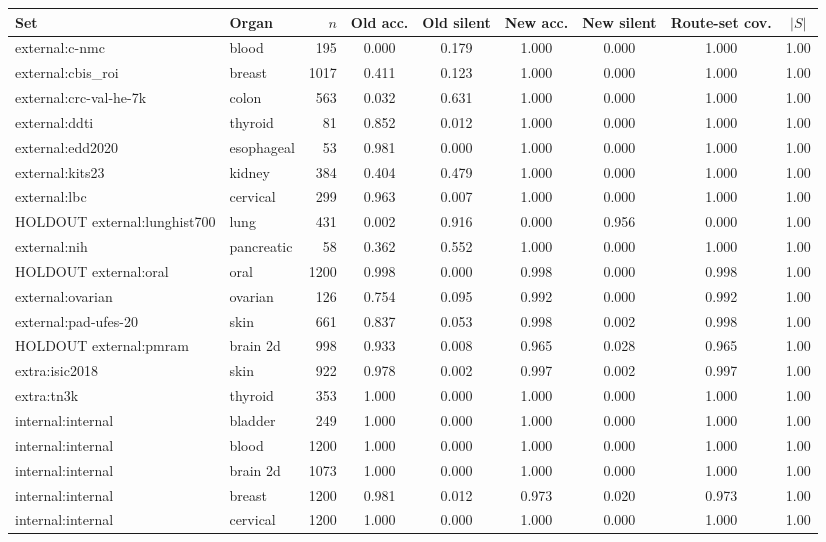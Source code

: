 \begin{tabular}{@{}llrcccccc@{}}
\toprule
Set & Organ & $n$ & Old acc. & Old silent & New acc. & New silent & Route-set cov. & $|S|$ \\
\midrule
external:c-nmc & blood & 195 & 0.000 & 0.179 & 1.000 & 0.000 & 1.000 & 1.00 \\
external:cbis\_roi & breast & 1017 & 0.411 & 0.123 & 1.000 & 0.000 & 1.000 & 1.00 \\
external:crc-val-he-7k & colon & 563 & 0.032 & 0.631 & 1.000 & 0.000 & 1.000 & 1.00 \\
external:ddti & thyroid & 81 & 0.852 & 0.012 & 1.000 & 0.000 & 1.000 & 1.00 \\
external:edd2020 & esophageal & 53 & 0.981 & 0.000 & 1.000 & 0.000 & 1.000 & 1.00 \\
external:kits23 & kidney & 384 & 0.404 & 0.479 & 1.000 & 0.000 & 1.000 & 1.00 \\
external:lbc & cervical & 299 & 0.963 & 0.007 & 1.000 & 0.000 & 1.000 & 1.00 \\
HOLDOUT external:lunghist700 & lung & 431 & 0.002 & 0.916 & 0.000 & 0.956 & 0.000 & 1.00 \\
external:nih & pancreatic & 58 & 0.362 & 0.552 & 1.000 & 0.000 & 1.000 & 1.00 \\
HOLDOUT external:oral & oral & 1200 & 0.998 & 0.000 & 0.998 & 0.000 & 0.998 & 1.00 \\
external:ovarian & ovarian & 126 & 0.754 & 0.095 & 0.992 & 0.000 & 0.992 & 1.00 \\
external:pad-ufes-20 & skin & 661 & 0.837 & 0.053 & 0.998 & 0.002 & 0.998 & 1.00 \\
HOLDOUT external:pmram & brain 2d & 998 & 0.933 & 0.008 & 0.965 & 0.028 & 0.965 & 1.00 \\
extra:isic2018 & skin & 922 & 0.978 & 0.002 & 0.997 & 0.002 & 0.997 & 1.00 \\
extra:tn3k & thyroid & 353 & 1.000 & 0.000 & 1.000 & 0.000 & 1.000 & 1.00 \\
internal:internal & bladder & 249 & 1.000 & 0.000 & 1.000 & 0.000 & 1.000 & 1.00 \\
internal:internal & blood & 1200 & 1.000 & 0.000 & 1.000 & 0.000 & 1.000 & 1.00 \\
internal:internal & brain 2d & 1073 & 1.000 & 0.000 & 1.000 & 0.000 & 1.000 & 1.00 \\
internal:internal & breast & 1200 & 0.981 & 0.012 & 0.973 & 0.020 & 0.973 & 1.00 \\
internal:internal & cervical & 1200 & 1.000 & 0.000 & 1.000 & 0.000 & 1.000 & 1.00 \\

\end{tabular}
